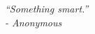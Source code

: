 
\newpage
\begin{table}
  \begin{flushright}
	\large{\emph{``Something smart.'' \\- Anonymous}}  
\end{flushright}
\end{table}

\newpage
\thispagestyle{empty}
